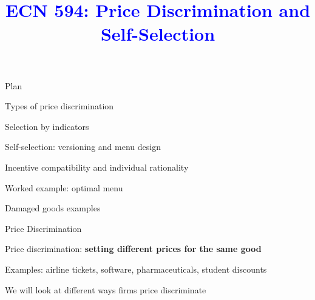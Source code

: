 \documentclass[notes,11pt, aspectratio=169]{beamer}
\title[]{\textcolor{blue}{ECN 594: Price Discrimination and Self-Selection}}
\author[PGP]{}
\institute[FRBNY]{\small{\begin{tabular}{c c c}
Nicholas Vreugdenhil \\
\end{tabular}}}
\date{}
\newenvironment{wideitemize}{\itemize\addtolength{\itemsep}{10pt}}{\enditemize}
\newenvironment{wideenumerate}{\enumerate\addtolength{\itemsep}{10pt}}{\endenumerate}
\begin{document}
\begin{frame}
\maketitle
  \centering
\end{frame}

\begin{frame}{Plan}
  \begin{wideenumerate}
    \item Types of price discrimination
    \item Selection by indicators
    \item Self-selection: versioning and menu design
    \item Incentive compatibility and individual rationality
    \item Worked example: optimal menu
    \item Damaged goods examples
  \end{wideenumerate}
\end{frame}



\begin{frame}{Price Discrimination}
\begin{wideitemize}
	\item Price discrimination: \textbf{setting different prices for the same good}
	\item Examples: airline tickets, software, pharmaceuticals, student discounts
	\item We will look at different ways firms price discriminate
\end{wideitemize}
\end{frame}
\end{document}
